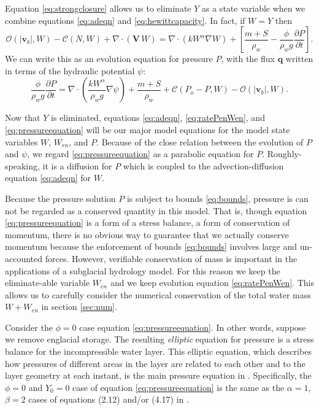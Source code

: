 \documentclass[11pt,final]{amsart}%
\newcommand\bv{\mathbf{v}}
\newcommand\bV{\mathbf{V}}
\newcommand\bq{\mathbf{q}}
\newcommand{\Div}{\nabla\cdot}
\newcommand{\grad}{\nabla}
\begin{document}
Equation \eqref{eq:strongclosure} allows us to eliminate $Y$ as a state variable when we combine equations \eqref{eq:adeqn} and \eqref{eq:hewittcapacity}.  In fact, if $W=Y$ then
\begin{equation}
\mathcal{O}(|\bv_b|,W) - \mathcal{C}(N,W) + \Div\left(\bV\, W\right) = \Div \left(k W^\alpha \grad W\right) + \left[\frac{m+S}{\rho_w} - \frac{\phi}{\rho_w g}\frac{\partial P}{\partial t}\right]. \label{eq:initialformpressure}
\end{equation}
We can write this as an evolution equation for pressure $P$, with the flux $\bq$ written in terms of the hydraulic potential $\psi$:
\begin{equation}
\frac{\phi}{\rho_w g}\frac{\partial P}{\partial t} = \Div\left(\frac{k W^\alpha}{\rho_w g} \grad \psi\right) + \frac{m+S}{\rho_w} + \mathcal{C}(P_o-P,W) - \mathcal{O}(|\bv_b|,W). \label{eq:pressureequation}
\end{equation}

Now that $Y$ is eliminated, equations \eqref{eq:adeqn}, \eqref{eq:ratePenWen}, and \eqref{eq:pressureequation} will be our major model equations for the model state variables $W$, $W_{en}$, and $P$.  Because of the close relation between the evolution of $P$ and $\psi$, we regard \eqref{eq:pressureequation} as a parabolic equation for $P$.  Roughly-speaking, it is a diffusion for $P$ which is coupled to the advection-diffusion equation \eqref{eq:adeqn} for $W$.

Because the pressure solution $P$ is subject to bounds \eqref{eq:bounds}, pressure is can not be regarded as a conserved quantity in this model.  That is, though equation \eqref{eq:pressureequation} is a form of a stress balance, a form of conservation of momentum, there is no obvious way to guarantee that we actually conserve momentum because the enforcement of bounds \eqref{eq:bounds} involves large and un-accounted forces.  However, verifiable conservation of mass is important in the applications of a subglacial hydrology model.  For this reason we keep the eliminate-able variable $W_{en}$ and we keep evolution equation \eqref{eq:ratePenWen}.  This allows us to carefully consider the numerical conservation of the total water mass $W+W_{en}$ in section \ref{sec:num}.

Consider the $\phi=0$ case equation \eqref{eq:pressureequation}.  In other words, suppose we remove englacial storage.  The resulting \emph{elliptic} equation for pressure is a stress balance for the incompressible water layer.  This elliptic equation, which describes how pressures of different areas in the layer are related to each other and to the layer geometry at each instant, is the main pressure equation in \citep{Schoofetal2012}.  Specifically, the $\phi=0$ and $Y_0=0$ case of equation \eqref{eq:pressureequation} is the same as the $\alpha=1$, $\beta=2$ cases of equations (2.12) and/or (4.17) in \citep{Schoofetal2012}.
\end{document}
